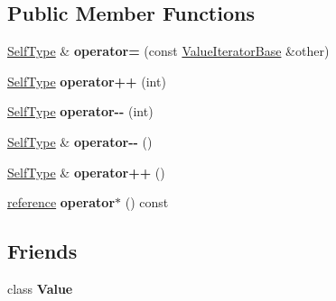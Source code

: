 \subsection*{Public Member Functions}
\begin{DoxyCompactItemize}
\item 
\hypertarget{class_json_1_1_value_const_iterator_ad1b1c11f8d7fb22d4d3c231915f2b15b}{\hyperlink{class_json_1_1_value_iterator_base}{Self\-Type} \& {\bfseries operator=} (const \hyperlink{class_json_1_1_value_iterator_base}{Value\-Iterator\-Base} \&other)}\label{class_json_1_1_value_const_iterator_ad1b1c11f8d7fb22d4d3c231915f2b15b}

\item 
\hypertarget{class_json_1_1_value_const_iterator_ab3f0c2edbfc8f7d60645f3d597d05e28}{\hyperlink{class_json_1_1_value_iterator_base}{Self\-Type} {\bfseries operator++} (int)}\label{class_json_1_1_value_const_iterator_ab3f0c2edbfc8f7d60645f3d597d05e28}

\item 
\hypertarget{class_json_1_1_value_const_iterator_a94935961e9331c6f7b907b05ec8df75e}{\hyperlink{class_json_1_1_value_iterator_base}{Self\-Type} {\bfseries operator-\/-\/} (int)}\label{class_json_1_1_value_const_iterator_a94935961e9331c6f7b907b05ec8df75e}

\item 
\hypertarget{class_json_1_1_value_const_iterator_a31415e44e44e56fb2bfda7e8bb784646}{\hyperlink{class_json_1_1_value_iterator_base}{Self\-Type} \& {\bfseries operator-\/-\/} ()}\label{class_json_1_1_value_const_iterator_a31415e44e44e56fb2bfda7e8bb784646}

\item 
\hypertarget{class_json_1_1_value_const_iterator_a2cfe2f7a94a688186efdafb1b181c319}{\hyperlink{class_json_1_1_value_iterator_base}{Self\-Type} \& {\bfseries operator++} ()}\label{class_json_1_1_value_const_iterator_a2cfe2f7a94a688186efdafb1b181c319}

\item 
\hypertarget{class_json_1_1_value_const_iterator_aeb44153d71c61ac9397a84d5ecc244c5}{\hyperlink{class_json_1_1_value}{reference} {\bfseries operator$\ast$} () const }\label{class_json_1_1_value_const_iterator_aeb44153d71c61ac9397a84d5ecc244c5}

\end{DoxyCompactItemize}
\subsection*{Friends}
\begin{DoxyCompactItemize}
\item 
\hypertarget{class_json_1_1_value_const_iterator_aeceedf6e1a7d48a588516ce2b1983d6f}{class {\bfseries Value}}\label{class_json_1_1_value_const_iterator_aeceedf6e1a7d48a588516ce2b1983d6f}

\end{DoxyCompactItemize}
